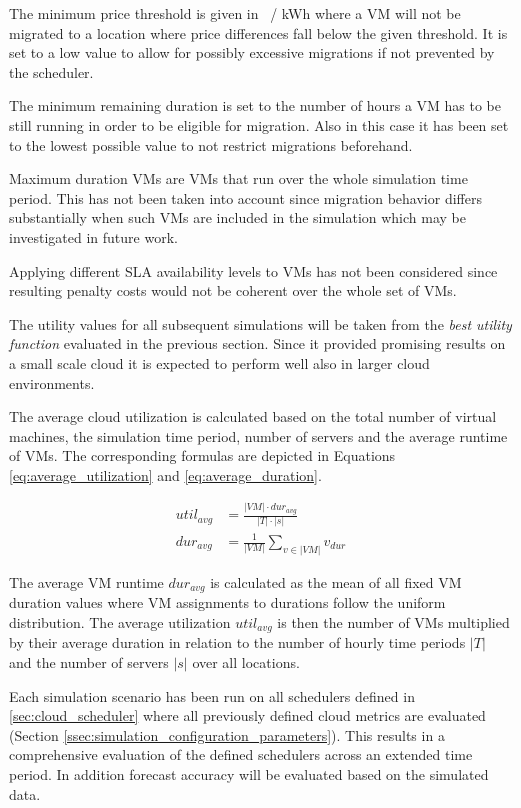 The minimum price threshold is given in \cent \ / kWh where a VM will not be migrated to a location where price differences fall below the given threshold. It is set to a low value to allow for possibly excessive migrations if not prevented by the scheduler. 

The minimum remaining duration is set to the number of hours a VM has to be still running in order to be eligible for migration. Also in this case it has been set to the lowest possible value to not restrict migrations beforehand. 

Maximum duration VMs are VMs that run over the whole simulation time period. This has not been taken into account since migration behavior differs substantially when such VMs are included in the simulation which may be investigated in future work. 

Applying different SLA availability levels to VMs has not been considered since resulting penalty costs would not be coherent over the whole set of VMs. 

The utility values for all subsequent simulations will be taken from the \textit{best utility function} evaluated in the previous section. Since it provided promising results on a small scale cloud it is expected to perform well also in larger cloud environments. 

The average cloud utilization is calculated based on the total number of virtual machines, the simulation time period, number of servers and the average runtime of VMs. The corresponding formulas are depicted in Equations \ref{eq:average_utilization} and \ref{eq:average_duration}.

\begin{align}
	util_{avg} &=  \frac{|VM| \cdot dur_{avg}}{|T| \cdot |s|} \label{eq:average_utilization} \\
	dur_{avg} &= \frac{1}{|VM|} \sum_{v \in |VM|} v_{dur} \label{eq:average_duration}
\end{align}

The average VM runtime $dur_{avg}$ is calculated as the mean of all fixed VM duration values where VM assignments to durations follow the uniform distribution. The average utilization $util_{avg}$ is then the number of VMs multiplied by their average duration  in relation to the number of hourly time periods $|T|$ and the number of servers $|s|$ over all locations. 

Each simulation scenario has been run on all schedulers defined in \ref{sec:cloud_scheduler} where all previously defined cloud metrics are evaluated (Section \ref{ssec:simulation_configuration_parameters}). This results in a comprehensive evaluation of the defined schedulers across an extended time period. 
In addition forecast accuracy will be evaluated based on the simulated data. 

